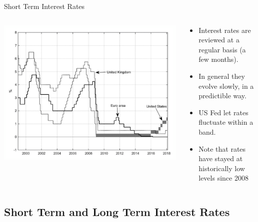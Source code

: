 \documentclass[
  ignorenonframetext,
  aspectratio=169,
]{beamer}
\providecommand{\tightlist}{%
  \setlength{\itemsep}{0pt}\setlength{\parskip}{0pt}}\usepackage{longtable,booktabs,array}
\begin{document}
\begin{frame}{Short Term Interest Rates}
\begin{columns}[T]
\begin{column}{0.48\textwidth}
\includegraphics{short_term.png}
\end{column}

\begin{column}{0.48\textwidth}
\begin{itemize}
\tightlist
\item
  Interest rates are reviewed at a regular basis (a few months).
\item
  In general they evolve slowly, in a predictible way.
\item
  US Fed let rates fluctuate within a band.
\item
  Note that rates have stayed at historically low levels since 2008
\end{itemize}
\end{column}
\end{columns}
\end{frame}

\subsection{Short Term and Long Term Interest
Rates}\label{short-term-and-long-term-interest-rates}
\end{document}
